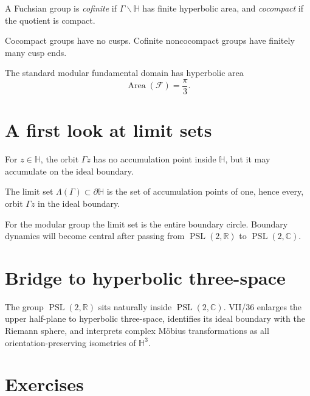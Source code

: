 \begin{definition}\label{def:vii35-cofinite}
A Fuchsian group is \emph{cofinite} if \(\Gamma\backslash\mathbb H\) has finite hyperbolic area, and \emph{cocompact} if the quotient is compact.
\end{definition}

Cocompact groups have no cusps.  Cofinite noncocompact groups have finitely many cusp ends.

\begin{example}\label{ex:vii35-modular-area}
The standard modular fundamental domain has hyperbolic area
\[
\operatorname{Area}(\mathcal F)=\frac{\pi}{3}.
\]
\end{example}


\section{A first look at limit sets}

For \(z\in\mathbb H\), the orbit \(\Gamma z\) has no accumulation point inside \(\mathbb H\), but it may accumulate on the ideal boundary.

\begin{definition}\label{def:vii35-limitset}
The limit set \(\Lambda(\Gamma)\subset\partial\mathbb H\) is the set of accumulation points of one, hence every, orbit \(\Gamma z\) in the ideal boundary.
\end{definition}

For the modular group the limit set is the entire boundary circle.  Boundary dynamics will become central after passing from \(\operatorname{PSL}(2,\mathbb R)\) to \(\operatorname{PSL}(2,\mathbb C)\).


\section{Bridge to hyperbolic three-space}

The group \(\operatorname{PSL}(2,\mathbb R)\) sits naturally inside \(\operatorname{PSL}(2,\mathbb C)\).  VII/36 enlarges the upper half-plane to hyperbolic three-space, identifies its ideal boundary with the Riemann sphere, and interprets complex Möbius transformations as all orientation-preserving isometries of \(\mathbb H^3\).

\section{Exercises}

